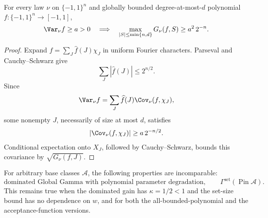 \begin{lemma}
\label{ian:universal-small-support-reveal}
For every law \(\nu\) on \(\{-1,1\}^n\) and globally bounded
degree-at-most-\(d\) polynomial \(f:\{-1,1\}^n\to[-1,1]\),
\[
 \Var_\nu f\ge a>0
 \quad\Longrightarrow\quad
 \max_{|S|\le\min\{n,d\}}G_\nu(f,S)\ge a^2\,2^{-n}.
\]
\end{lemma}

\begin{proof}
Expand \(f=\sum_J\widehat f(J)\chi_J\) in uniform Fourier characters.
Parseval and Cauchy--Schwarz give
\[
 \sum_J|\widehat f(J)|\le2^{n/2}.
\]
Since
\[
 \Var_\nu f
 =\sum_J\widehat f(J)\Cov_\nu(f,\chi_J),
\]
some nonempty \(J\), necessarily of size at most \(d\), satisfies
\[
 |\Cov_\nu(f,\chi_J)|\ge a\,2^{-n/2}.
\]
Conditional expectation onto \(X_J\), followed by Cauchy--Schwarz,
bounds this covariance by \(\sqrt{G_\nu(f,J)}\).
\end{proof}

\begin{proposition}
\label{ian:dominated-global-pinning-incomparable}
For arbitrary base classes \(\mathcal A\), the following properties
are incomparable:
\[
 \text{dominated Global Gamma with polynomial parameter degradation},
 \qquad
 \Gamma^{\mathrm{set}}(\operatorname{Pin}\mathcal A).
\]
This remains true when the dominated gain has
\(\kappa=1/2<1\) and the set-size bound has no dependence on \(w\),
and for both the all-bounded-polynomial and the acceptance-function
versions.
\end{proposition}

